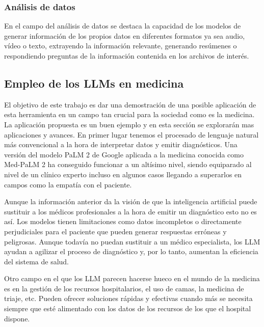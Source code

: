 \subsubsection{Análisis de datos}

En el campo del análisis de datos se destaca la capacidad de los modelos de generar información de los propios datos en diferentes formatos ya sea audio, vídeo o texto, extrayendo la información relevante, generando resúmenes o respondiendo preguntas de la información contenida en los archivos de interés.

\cite{jesse_sumrak_7_2024}

\subsection{Empleo de los LLMs en medicina}

El objetivo de este trabajo es dar una demostración de una posible aplicación de esta herramienta en un campo tan crucial para la sociedad como es la medicina. La aplicación propuesta es un buen ejemplo y en esta sección se explorarán mas aplicaciones y avances.
En primer lugar tenemos el procesado de lenguaje natural más convencional a la hora de interpretar datos y emitir diagnósticos. Una versión del modelo PaLM 2 de Google aplicada a la medicina conocida como Med-PaLM 2 ha conseguido funcionar a un altísimo nivel, siendo equiparado al nivel de un clínico experto incluso en algunos casos llegando a superarlos en campos como la empatía con el paciente.

Aunque la información anterior da la visión de que la inteligencia artificial puede sustituir a los médicos profesionales a la hora de emitir un diagnóstico esto no es así. Los modelos tienen limitaciones como datos incompletos o directamente perjudiciales para el paciente que pueden generar respuestas erróneas y peligrosas. Aunque todavía no puedan sustituir a un médico especialista, los LLM ayudan a agilizar el proceso de diagnóstico y, por lo tanto, aumentan la eficiencia del sistema de salud.

Otro campo en el que los LLM parecen hacerse hueco en el mundo de la medicina es en la gestión de los recursos hospitalarios, el uso de camas, la medicina de triaje, etc. Pueden ofrecer soluciones rápidas y efectivas cuando más se necesita siempre que esté alimentado con los datos de los recursos de los que el hospital dispone.

